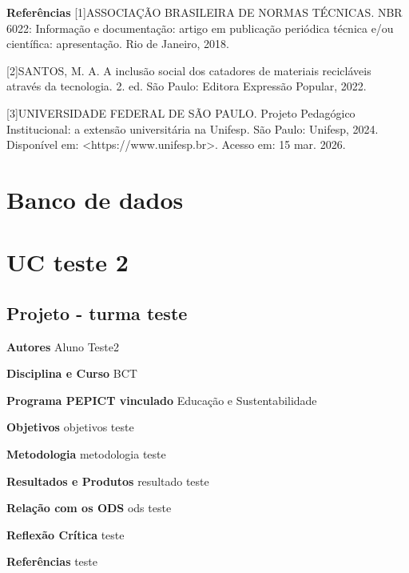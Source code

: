 \documentclass[12pt,openright,oneside,a4paper]{report}
\begin{document}
\vspace{0.7cm}
\noindent
\textbf{Referências}
[1]ASSOCIAÇÃO BRASILEIRA DE NORMAS TÉCNICAS. NBR 6022: Informação e documentação: artigo em
publicação periódica técnica e/ou científica: apresentação. Rio de Janeiro, 2018.

[2]SANTOS, M. A. A inclusão social dos catadores de materiais recicláveis através da tecnologia. 2. ed. São
Paulo: Editora Expressão Popular, 2022.

[3]UNIVERSIDADE FEDERAL DE SÃO PAULO. Projeto Pedagógico Institucional: a extensão universitária na
Unifesp. São Paulo: Unifesp, 2024. Disponível em: <https://www.unifesp.br>. Acesso em: 15 mar. 2026.

\vspace{0.7cm}
\chapter{Banco de dados}

\chapter{UC teste 2}

\section{Projeto - turma teste}
\noindent
\textbf{Autores}
Aluno Teste2

\vspace{0.7cm}
\noindent
\textbf{Disciplina e Curso}
BCT

\vspace{0.7cm}
\noindent
\textbf{Programa PEPICT vinculado}
Educação e Sustentabilidade

\vspace{0.7cm}
\noindent
\textbf{Objetivos}
objetivos teste

\vspace{0.7cm}
\noindent
\textbf{Metodologia}
metodologia teste

\vspace{0.7cm}
\noindent
\textbf{Resultados e Produtos}
resultado teste

\vspace{0.7cm}
\noindent
\textbf{Relação com os ODS}
ods teste

\vspace{0.7cm}
\noindent
\textbf{Reflexão Crítica}
teste

\vspace{0.7cm}
\noindent
\textbf{Referências}
teste

\vspace{0.7cm}
\end{document}
